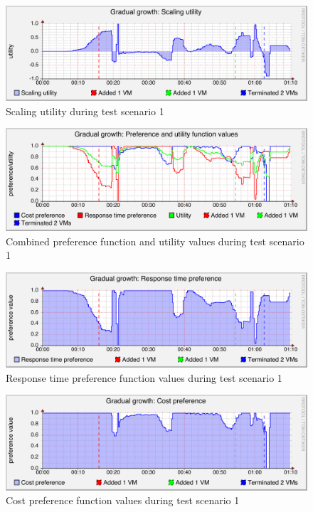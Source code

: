 \documentclass[english]{tktltiki2}
\theoremstyle{definition}
\theoremstyle{remark}
\begin{document}
\begin{figure}[htbp]
	\includegraphics[width=\textwidth]{images/scalingutilitygraph-test21}
	\caption{Scaling utility during test scenario 1}
	\label{fig:scalingUtilityScenario1}
\end{figure}

\begin{figure}[htbp]
	\includegraphics[width=\textwidth]{images/preferencesgraph-test21}
	\caption{Combined preference function and utility values during test scenario 1}
	\label{fig:preferencesScenario1}
\end{figure}

\begin{figure}[htbp]
	\includegraphics[width=\textwidth]{images/responsetimepreferencegraph-test21}
	\caption{Response time preference function values during test scenario 1}
	\label{fig:responseTimePreferenceScenario1}
\end{figure}

\begin{figure}[htbp]
	\includegraphics[width=\textwidth]{images/costpreferencegraph-test21}
	\caption{Cost preference function values during test scenario 1}
	\label{fig:costPreferenceScenario1}
\end{figure}
\end{document}
